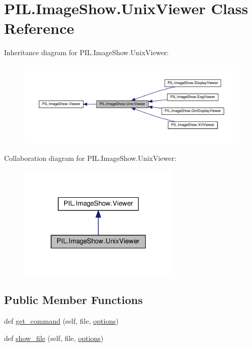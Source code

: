 \hypertarget{classPIL_1_1ImageShow_1_1UnixViewer}{}\section{P\+I\+L.\+Image\+Show.\+Unix\+Viewer Class Reference}
\label{classPIL_1_1ImageShow_1_1UnixViewer}


Inheritance diagram for P\+I\+L.\+Image\+Show.\+Unix\+Viewer\+:
\nopagebreak
\begin{figure}[H]
\begin{center}
\leavevmode
\includegraphics[width=350pt]{classPIL_1_1ImageShow_1_1UnixViewer__inherit__graph}
\end{center}
\end{figure}


Collaboration diagram for P\+I\+L.\+Image\+Show.\+Unix\+Viewer\+:
\nopagebreak
\begin{figure}[H]
\begin{center}
\leavevmode
\includegraphics[width=220pt]{classPIL_1_1ImageShow_1_1UnixViewer__coll__graph}
\end{center}
\end{figure}
\subsection*{Public Member Functions}
\begin{DoxyCompactItemize}
\item 
def \hyperlink{classPIL_1_1ImageShow_1_1UnixViewer_aefe55625650578d9d10ccce05e6ee390}{get\+\_\+command} (self, file, \hyperlink{classPIL_1_1ImageShow_1_1UnixViewer_afbac95ff1c2d0ab0858163dd7e80671e}{options})
\item 
def \hyperlink{classPIL_1_1ImageShow_1_1UnixViewer_a5b6a1d7b5d10c205784f0d195fb3dab9}{show\+\_\+file} (self, file, \hyperlink{classPIL_1_1ImageShow_1_1UnixViewer_afbac95ff1c2d0ab0858163dd7e80671e}{options})
\end{DoxyCompactItemize}
